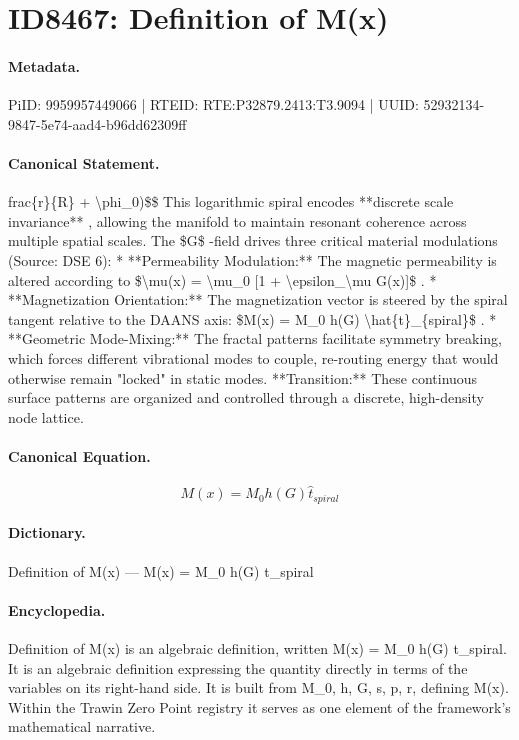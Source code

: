 \section*{ID8467: Definition of M(x)}
\paragraph{Metadata.}
PiID: 9959957449066 | RTEID: RTE:P32879.2413:T3.9094 | UUID: 52932134-9847-5e74-aad4-b96dd62309ff

\paragraph{Canonical Statement.}
frac\{r\}\{R\} + \textbackslash{}phi\_0)\$\$ This logarithmic spiral encodes **discrete scale invariance** , allowing the manifold to maintain resonant coherence across multiple spatial scales. The \$G\$ -field drives three critical material modulations (Source: DSE 6): * **Permeability Modulation:** The magnetic permeability is altered according to \$\textbackslash{}mu(x) = \textbackslash{}mu\_0 [1 + \textbackslash{}epsilon\_\textbackslash{}mu G(x)]\$ . * **Magnetization Orientation:** The magnetization vector is steered by the spiral tangent relative to the DAANS axis: \$M(x) = M\_0 h(G) \textbackslash{}hat\{t\}\_\{spiral\}\$ . * **Geometric Mode-Mixing:** The fractal patterns facilitate symmetry breaking, which forces different vibrational modes to couple, re-routing energy that would otherwise remain "locked" in static modes. **Transition:** These continuous surface patterns are organized and controlled through a discrete, high-density node lattice.

\paragraph{Canonical Equation.}
\[
M(x) = M_0 h(G) \hat{t}_{spiral}
\]

\paragraph{Dictionary.}
Definition of M(x) — M(x) = M\_0 h(G) t\_spiral

\paragraph{Encyclopedia.}
Definition of M(x) is an algebraic definition, written M(x) = M\_0 h(G) t\_spiral. It is an algebraic definition expressing the quantity directly in terms of the variables on its right-hand side. It is built from M\_0, h, G, s, p, r, defining M(x). Within the Trawin Zero Point registry it serves as one element of the framework's mathematical narrative.
